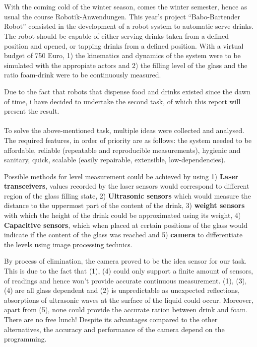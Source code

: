 \documentclass[11pt]{article}
\begin{document}
 \mbox{}
    \section*{}
    With the coming cold of the winter season, comes the winter semester, hence as usual the course Robotik-Anwendungen.
    This year's project \enquote{Babo-Bartender Robot} consisted in the development of a robot system to automatic
    serve drinks.
    The robot should be capable of either serving drinks taken from a defined position and opened, or tapping drinks from
    a defined position.
    With a virtual budget of 750 Euro, 1) the kinematics and dynamics of the system were to be simulated with the appropiate
    actors and 2) the filling level of the glass and the ratio foam-drink were to be continuously measured.
 
    Due to the fact that robots that dispense food and drinks existed since the dawn of time, i have decided to undertake
    the second task, of which this report will present the result.

    \paragraph*{}
    To solve the above-mentioned task, multiple ideas were collected and analysed.
    The required features, in order of priority are as follows: the system needed to be affordable, reliable (repeatable
    and reproducible measurements), hygienic and sanitary, quick, scalable (easily repairable, extensible, low-dependencies).

    Possible methods for level measurement could be achieved by using 1) \textbf{Laser transceivers}, values recorded by
    the laser sensors would correspond to different region of the glass filling state, 2) \textbf{Ultrasonic sensors} which
    would measure the distance to the uppermost part of the content of the drink, 3) \textbf{weight sensors} with which
    the height of the drink could be approximated using its weight, 4) \textbf{Capacitive sensors}, which when placed
    at certain positions of the glass would indicate if the content of the glass was reached and 5) \textbf{camera} to
    differentiate the levels using image processing technics.

    By process of elimination, the camera proved to be the idea sensor for our task.
    This is due to the fact that (1), (4) could only support a finite amount of sensors, of readings and hence won't
    provide accurate continuous measurement.
    (1), (3), (4) are all glass dependent and (2) is unpredictable as unexpected reflections, absorptions of ultrasonic
    waves at the surface of the liquid could occur.
    Moreover, apart from (5), none could provide the accurate ration between drink and foam.
    There are no free lunch!
    Despite its advantages compared to the other alternatives, the accuracy and performance of the camera depend on the
    programming.
\end{document}
